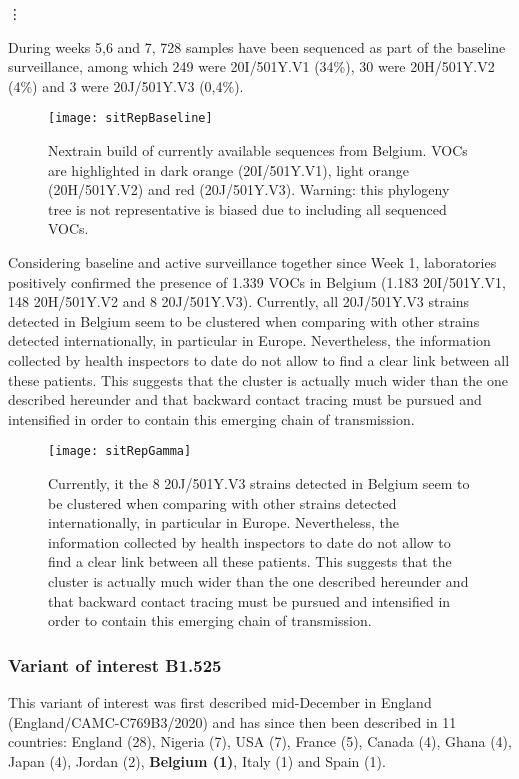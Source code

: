 \vdots

During weeks 5,6 and 7, 728 samples have been sequenced as part of the baseline surveillance, among which 249 were 20I/501Y.V1 (34\%), 30 were 20H/501Y.V2 (4\%) and 3 were 20J/501Y.V3 (0,4\%).

\begin{figure}[ht]
  \centering
  \texttt{[image: sitRepBaseline]}
  \caption[Baseline surveillance VOC phylogeny]{Nextrain build of currently available sequences from Belgium. VOCs are highlighted in dark orange (20I/501Y.V1), light orange (20H/501Y.V2) and red (20J/501Y.V3). Warning: this phylogeny tree is not representative is biased due to including all sequenced VOCs.}
  \label{fig:sitRepBaseline}
\end{figure}

Considering baseline and active surveillance together since Week 1, laboratories positively confirmed the presence of 1.339 VOCs in Belgium (1.183 20I/501Y.V1, 148 20H/501Y.V2 and 8 20J/501Y.V3).
Currently, all 20J/501Y.V3 strains detected in Belgium seem to be clustered when comparing with other strains detected internationally, in particular in Europe.
Nevertheless, the information collected by health inspectors to date do not allow to find a clear link between all these patients.
This suggests that the cluster is actually much wider than the one described hereunder and that backward contact tracing must be pursued and intensified in order to contain this emerging chain of transmission.

\begin{figure}[ht]
  \centering
  \texttt{[image: sitRepGamma]}
  \caption[20J/501Y.V3 monitoring]{Currently, it the 8 20J/501Y.V3 strains detected in Belgium seem to be clustered when comparing with other strains detected internationally, in particular in Europe. Nevertheless, the information collected by health inspectors to date do not allow to find a clear link between all these patients. This suggests that the cluster is actually much wider than the one described hereunder and that backward contact tracing must be pursued and intensified in order to contain this emerging chain of transmission.}
  \label{fig:sitRepGamma}
\end{figure}

\subsubsection{Variant of interest B1.525}
This variant of interest was first described mid-December in England (England/CAMC-C769B3/2020) and has since then been described in 11 countries: England (28), Nigeria (7), USA (7), France (5), Canada (4), Ghana (4), Japan (4), Jordan (2), \textbf{Belgium (1)}, Italy (1) and Spain (1).


